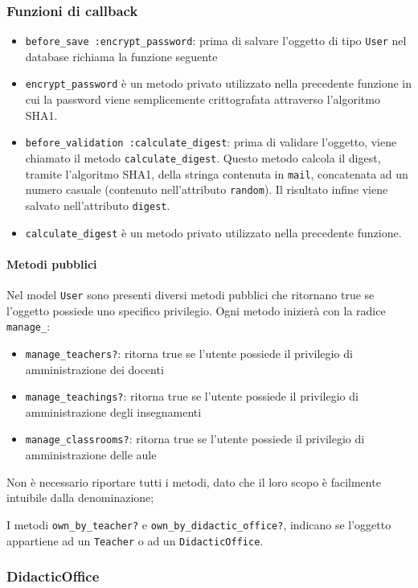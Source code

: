 \documentclass[11pt,a4paper]{article}
\begin{document}
\subsubsection*{Funzioni di callback}
\begin{itemize}
 \item \verb|before_save :encrypt_password|: prima di salvare l'oggetto di tipo \verb|User| nel database richiama la funzione seguente
\item \verb|encrypt_password| è un metodo privato utilizzato nella precedente funzione in cui la password viene semplicemente crittografata attraverso l'algoritmo SHA1.
\item \verb|before_validation :calculate_digest|: prima di validare l'oggetto, viene chiamato il metodo \verb|calculate_digest|. Questo metodo calcola il digest, tramite l'algoritmo SHA1, della stringa contenuta in \verb|mail|, concatenata ad un numero casuale (contenuto nell'attributo \verb|random|). Il risultato infine viene salvato nell'attributo \verb|digest|.
\item \verb|calculate_digest| è un metodo privato utilizzato nella precedente funzione.
\end{itemize}
\paragraph{Metodi pubblici}
Nel model \verb|User| sono presenti diversi metodi pubblici che ritornano true se l'oggetto possiede uno specifico privilegio. Ogni metodo inizierà con la radice \verb|manage_|:
\begin{itemize}
 \item \verb|manage_teachers?|: ritorna true se l'utente possiede il privilegio di amministrazione dei docenti
 \item \verb|manage_teachings?|: ritorna true se l'utente possiede il privilegio di amministrazione degli insegnamenti
 \item \verb|manage_classrooms?|: ritorna true se l'utente possiede il privilegio di amministrazione delle aule
 \end{itemize}
Non è necessario riportare tutti i metodi, dato che il loro scopo è facilmente intuibile dalla denominazione;

I metodi \verb|own_by_teacher?| e \verb|own_by_didactic_office?|, indicano se l'oggetto appartiene ad un \verb|Teacher| o ad un \verb|DidacticOffice|.
\subsubsection{DidacticOffice}
\end{document}
